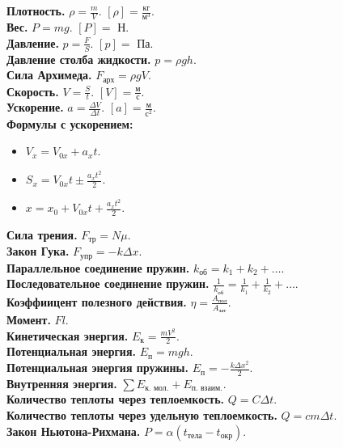 \documentclass{article}
\begin{document}
	\noindent
	\textbf{Плотность.} $\rho = \frac{m}{V}$. $[\rho] = \frac{\text{кг}}{\text{м}^3}$. \\
	\textbf{Вес.} $P = mg$. $[P] =$ Н. \\
	\textbf{Давление.} $p = \frac{F}{S}$. $[p] =$ Па. \\
	\textbf{Давление столба жидкости.} $p = \rho g h$. \\
	\textbf{Сила Архимеда.} $F_{\text{арх}} = \rho g V$. \\
	\textbf{Скорость.} $V = \frac{S}{t}$. $[V] = \frac{\text{м}}{\text{с}}$. \\
	\textbf{Ускорение.} $a = \frac{\varDelta V}{\varDelta t}$. $[a] = \frac{\text{м}}{\text{с}^2}$. \\
	\textbf{Формулы с ускорением:}
	\begin{itemize}
		\item $V_x = V_{0x} + a_xt$.
		\item $S_x = V_{0x}t \pm \frac{a_xt^2}{2}$.
		\item $x = x_0 + V_{0x}t + \frac{a_xt^2}{2}$.
	\end{itemize}
	\textbf{Сила трения.} $F_{\text{тр}} = N \mu$. \\
	\textbf{Закон Гука.} $F_{\text{упр}} = -k \varDelta x$. \\
	\textbf{Параллельное соединение пружин.} $k_{\text{об}} = k_1 + k_2 + \dots$. \\
	\textbf{Последовательное соединение пружин.} $\frac{1}{k_{\text{об}}} = \frac{1}{k_1} + \frac{1}{k_2} + \dots$. \\
	\textbf{Коэффиицент полезного действия.} $\eta = \frac{A_{\text{пол}}}{A_{\text{зат}}}$. \\
	\textbf{Момент.} $Fl$. \\
	\textbf{Кинетическая энергия.} $E_{\text{к}} = \frac{mV^2}{2}$. \\
	\textbf{Потенциальная энергия.} $E_{\text{п}} = mgh$. \\
	\textbf{Потенциальная энергия пружины.} $E_{\text{п}} = -\frac{k \varDelta x^2}{2}$. \\
	\textbf{Внутренняя энергия.} $\sum E_{\text{к. мол.}} + E_{\text{п. взаим.}}$. \\
	\textbf{Количество теплоты через теплоемкость.} $Q = C \varDelta t$. \\
	\textbf{Количество теплоты через удельную теплоемкость.} $Q = c m \varDelta t$. \\
	\textbf{Закон Ньютона-Рихмана.} $P = \alpha (t_{\text{тела}} - t_{\text{окр}})$. \\
\end{document}

